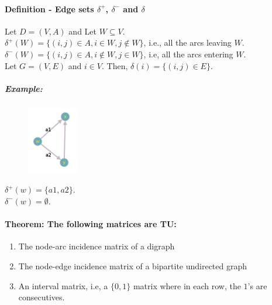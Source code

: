\documentclass[main]{subfiles}
\begin{document}
\paragraph{Definition -  Edge sets $\delta^+$, $\delta^-$ and $\delta$}
Let $D=(V,A)$ and Let $W \subseteq V$.\\
$\delta^+(W) = \{(i,j) \in A, i \in W, j \notin W \}$, i.e., all the arcs
leaving $W$.\\
$\delta^-(W) = \{(i,j) \in A, i \notin W, j \in W \}$, i.e, all the arcs
entering $W$.\\
Let $G=(V,E)$ and $i \in V$. Then, $\delta(i) = \{(i,j) \in E\}$.

\subparagraph{Example:}
\begin{figure}[!h]
  \centering
    \includegraphics[width=0.2\textwidth]{imgs/graph-definition.png}
\end{figure}

$\delta^+(w) = \{a1,a2\}$.\\
$\delta^-(w) = \emptyset$.\\

\paragraph{Theorem: The following matrices are TU:}
\begin{enumerate}
\itemsep0em
\item The node-arc incidence matrix of a digraph
\item The node-edge incidence matrix of a bipartite undirected graph
\item An interval matrix, i.e, a $\{0,1\}$ matrix where in each row, the $1$'s
are consecutives.
\end{enumerate}
\end{document}
